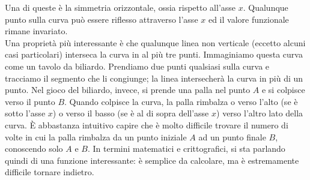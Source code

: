 Una di queste è la simmetria orizzontale, ossia rispetto all'asse $x$. Qualunque punto sulla curva può essere riflesso attraverso l'asse $x$ ed il valore funzionale rimane invariato.\\
Una proprietà più interessante è che qualunque linea non verticale (eccetto alcuni casi particolari) interseca la curva in al più tre punti. Immaginiamo questa curva come un tavolo da biliardo. Prendiamo due punti qualsiasi sulla curva e tracciamo il segmento che li congiunge; la linea intersecherà la curva in più di un punto. Nel gioco del biliardo, invece, si prende una palla nel punto $A$ e si colpisce verso il punto $B$. Quando colpisce la curva, la palla rimbalza o verso l'alto (se è sotto l'asse $x$) o verso il basso (se è al di sopra dell'asse $x$) verso l'altro lato della curva. È abbastanza intuitivo capire che è molto difficile trovare il numero di volte in cui la palla rimbalza da un punto iniziale $A$ ad un punto finale $B$, conoscendo solo $A$ e $B$. In termini matematici e crittografici, si sta parlando quindi di una funzione interessante: è semplice da calcolare, ma è estremamente difficile tornare indietro.

